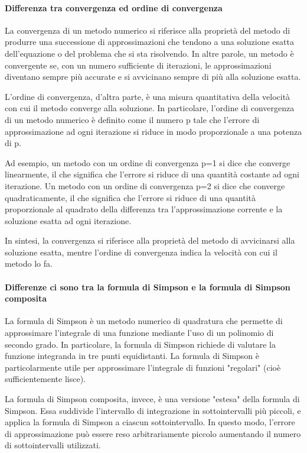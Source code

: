 \paragraph{Differenza tra convergenza ed ordine di convergenza}
La convergenza di un metodo numerico si riferisce alla proprietà del metodo di produrre una successione di approssimazioni che tendono a una soluzione esatta dell'equazione o del problema che si sta risolvendo. In altre parole, un metodo è convergente se, con un numero sufficiente di iterazioni, le approssimazioni diventano sempre più accurate e si avvicinano sempre di più alla soluzione esatta.

L'ordine di convergenza, d'altra parte, è una misura quantitativa della velocità con cui il metodo converge alla soluzione. In particolare, l'ordine di convergenza di un metodo numerico è definito come il numero p tale che l'errore di approssimazione ad ogni iterazione si riduce in modo proporzionale a una potenza di p.

Ad esempio, un metodo con un ordine di convergenza p=1 si dice che converge linearmente, il che significa che l'errore si riduce di una quantità costante ad ogni iterazione. Un metodo con un ordine di convergenza p=2 si dice che converge quadraticamente, il che significa che l'errore si riduce di una quantità proporzionale al quadrato della differenza tra l'approssimazione corrente e la soluzione esatta ad ogni iterazione.

In sintesi, la convergenza si riferisce alla proprietà del metodo di avvicinarsi alla soluzione esatta, mentre l'ordine di convergenza indica la velocità con cui il metodo lo fa.

\paragraph{Differenze ci sono tra la formula di Simpson e la formula di Simpson composita}
La formula di Simpson è un metodo numerico di quadratura che permette di approssimare l'integrale di una funzione mediante l'uso di un polinomio di secondo grado. In particolare, la formula di Simpson richiede di valutare la funzione integranda in tre punti equidistanti. La formula di Simpson è particolarmente utile per approssimare l'integrale di funzioni "regolari" (cioè sufficientemente lisce).

La formula di Simpson composita, invece, è una versione "estesa" della formula di Simpson. Essa suddivide l'intervallo di integrazione in sottointervalli più piccoli, e applica la formula di Simpson a ciascun sottointervallo. In questo modo, l'errore di approssimazione può essere reso arbitrariamente piccolo aumentando il numero di sottointervalli utilizzati.

